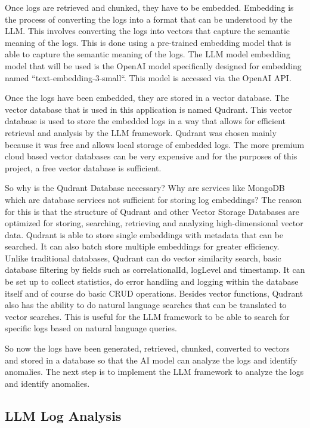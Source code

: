 \documentclass[sigconf]{acmart}
\begin{document}
Once logs are retrieved and chunked, they have to be embedded. Embedding is the process of converting the logs into a format that can be understood by the LLM. This involves converting the logs into vectors that capture the semantic meaning of the logs. This is done using a pre-trained embedding model that is able to capture the semantic meaning of the logs. The LLM model embedding model that will be used is the OpenAI model specifically designed for embedding named ``text-embedding-3-small``. This model is accessed via the OpenAI API.

Once the logs have been embedded, they are stored in a vector database. The vector database that is used in this application is named Qudrant. This vector database is used to store the embedded logs in a way that allows for efficient retrieval and analysis by the LLM framework. Qudrant was chosen mainly because it was free and allows local storage of embedded logs. The more premium cloud based vector databases can be very expensive and for the purposes of this project, a free vector database is sufficient.

So why is the Qudrant Database necessary? Why are services like MongoDB which are database services not sufficient for storing log embeddings? The reason for this is that the structure of Qudrant and other Vector Storage Databases are optimized for storing, searching, retrieving and analyzing high-dimensional vector data. Qudrant is able to store single embeddings with metadata that can be searched. It can also batch store multiple embeddings for greater efficiency. Unlike traditional databases, Qudrant can do vector similarity search, basic database filtering by fields such as correlationalId, logLevel and timestamp. It can be set up to collect statistics, do error handling and logging within the database itself and of course do basic CRUD operations. Besides vector functions, Qudrant also has the ability to do natural language searches that can be translated to vector searches. This is useful for the LLM framework to be able to search for specific logs based on natural language queries.

So now the logs have been generated, retrieved, chunked, converted to vectors and stored in a database so that the AI model can analyze the logs and identify anomalies. The next step is to implement the LLM framework to analyze the logs and identify anomalies.

\subsection{LLM Log Analysis}
\end{document}
